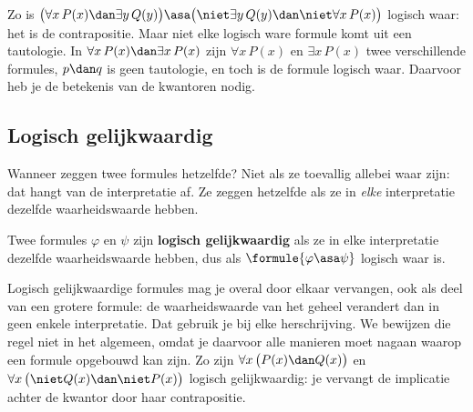 Zo is $\bigl(\forall x\, P(x) \dan \exists y\, Q(y)\bigr) \asa \bigl(\niet\exists y\, Q(y) \dan \niet\forall x\, P(x)\bigr)$ logisch waar: het is de contrapositie. Maar niet elke logisch ware formule komt uit een tautologie. In $\forall x\, P(x) \dan \exists x\, P(x)$ zijn $\forall x\, P(x)$ en $\exists x\, P(x)$ twee verschillende formules, $p \dan q$ is geen tautologie, en toch is de formule logisch waar. Daarvoor heb je de betekenis van de kwantoren nodig.

\begin{oefeningen}
\end{oefeningen}

\subsection{Logisch gelijkwaardig}

Wanneer zeggen twee formules hetzelfde? Niet als ze toevallig allebei waar zijn: dat hangt van de interpretatie af. Ze zeggen hetzelfde als ze in \textit{elke} interpretatie dezelfde waarheidswaarde hebben.

\begin{theorie}
Twee formules $\varphi$ en $\psi$ zijn \textbf{\textcolor{accent}{logisch gelijkwaardig}} als ze in elke interpretatie dezelfde waarheidswaarde hebben, dus als $\formule{\varphi \asa \psi}$ logisch waar is.
\end{theorie}

Logisch gelijkwaardige formules mag je overal door elkaar vervangen, ook als deel van een grotere formule: de waarheidswaarde van het geheel verandert dan in geen enkele interpretatie. Dat gebruik je bij elke herschrijving. We bewijzen die regel niet in het algemeen, omdat je daarvoor alle manieren moet nagaan waarop een formule opgebouwd kan zijn. Zo zijn $\forall x\, \bigl(P(x) \dan Q(x)\bigr)$ en $\forall x\, \bigl(\niet Q(x) \dan \niet P(x)\bigr)$ logisch gelijkwaardig: je vervangt de implicatie achter de kwantor door haar contrapositie.


